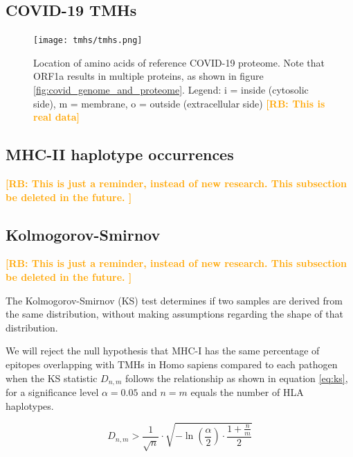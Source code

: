 \documentclass{article}
\newcommand{\richel}[1]{\textcolor{orange}{\textbf{[RB: #1]}}}
\begin{document}
\subsection{COVID-19 TMHs}

\begin{figure}[!htbp]
  \texttt{[image: tmhs/tmhs.png]}
  \caption{
    Location of amino acids of reference COVID-19 proteome.
    Note that ORF1a results in multiple proteins, 
    as shown in figure \ref{fig:covid_genome_and_proteome}.
    Legend: i = inside (cytosolic side), m = membrane, o = outside (extracellular side)
    \richel{This is real data}
  }
  \label{fig:covid_locatome}
\end{figure}


\subsection{MHC-II haplotype occurrences}

\richel{
  This is just a reminder, instead of new research. 
  This subsection be deleted in the future.
}

\begin{table}
  
  \caption{
    Percentage of MHC-II haplotypes, from \cite{greenbaum2011functional}
    \richel{
      This is just a reminder, instead of new research. 
      This table be deleted in the future.
    }
  }
  \label{table:mhc2_haplotypes}
\end{table}

\subsection{Kolmogorov-Smirnov}

\richel{
  This is just a reminder, instead of new research. 
  This subsection be deleted in the future.
}

The Kolmogorov-Smirnov (KS) test determines if two samples
are derived from the same distribution, without making assumptions
regarding the shape of that distribution. 

We will reject
the null hypothesis that MHC-I has the same percentage of epitopes 
overlapping with TMHs in Homo sapiens compared to each pathogen when 
the KS statistic $D_{n,m}$ follows the relationship as shown in 
equation \ref{eq:ks}, for a significance level $\alpha = 0.05$
and $n = m$ equals the number of HLA haplotypes.

\begin{equation}
   D_{n,m} > \frac{1}{\sqrt{n}} \cdot \sqrt{ -\ln(\frac{\alpha}{2}) \cdot \frac{1 + \frac{n}{m}}{2} }
   \label{eq:ks}
\end{equation}
\end{document}
